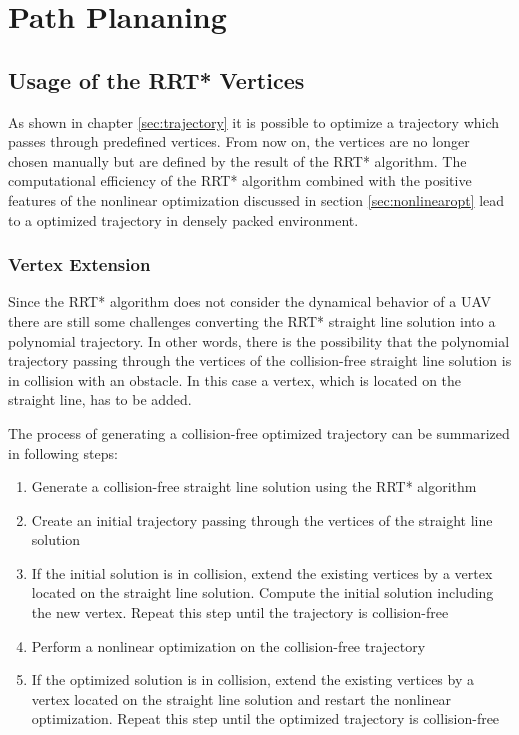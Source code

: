\chapter{Path Plananing}\label{chap:Planning}

\section{Usage of the RRT* Vertices}

As shown in chapter \ref{sec:trajectory} it is possible to optimize a trajectory which passes through predefined vertices. From now on, the vertices are no longer chosen manually but are defined by the result of the RRT* algorithm. The computational efficiency of the RRT* algorithm combined with the positive features of the nonlinear optimization discussed in section \ref{sec:nonlinearopt} lead to a optimized trajectory in densely packed environment.

\subsection{Vertex Extension}


Since the RRT* algorithm does not consider the dynamical behavior of a UAV there are still some challenges converting the RRT* straight line solution into a polynomial trajectory. In other words, there is the possibility that the polynomial trajectory passing through the vertices of the collision-free straight line solution is in collision with an obstacle. In this case a vertex, which is located on the straight line, has to be added. \newline

The process of generating a collision-free optimized trajectory can be summarized in following steps:


\begin{enumerate}
  \item Generate a collision-free straight line solution using the RRT* algorithm
  \item Create an initial trajectory passing through the vertices of the straight line solution
  \item If the initial solution is in collision, extend the existing vertices by a vertex located on the straight line solution. Compute the initial solution including the new vertex. Repeat this step until the trajectory is collision-free
\item Perform a nonlinear optimization on the collision-free trajectory
\item If the optimized solution is in collision, extend the existing vertices by a vertex located on the straight line solution and restart the nonlinear optimization. Repeat this step until the optimized trajectory is collision-free
\end{enumerate}

